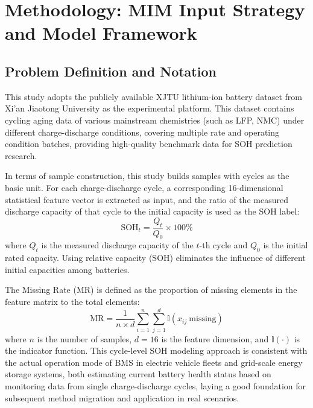 \documentclass[10pt,a4paper]{article}
\begin{document}
\section{Methodology: MIM Input Strategy and Model Framework}\label{sec:method}

\subsection{Problem Definition and Notation}

This study adopts the publicly available XJTU lithium-ion battery dataset from Xi'an Jiaotong University as the experimental platform\cite{wang2024open,duan2025lithium}. This dataset contains cycling aging data of various mainstream chemistries (such as LFP, NMC) under different charge-discharge conditions, covering multiple rate and operating condition batches, providing high-quality benchmark data for SOH prediction research\cite{wang2024open,wang2024pinn}.

In terms of sample construction, this study builds samples with cycles as the basic unit. For each charge-discharge cycle, a corresponding 16-dimensional statistical feature vector is extracted as input, and the ratio of the measured discharge capacity of that cycle to the initial capacity is used as the SOH label:
\begin{equation}
    \text{SOH}_t = \frac{Q_t}{Q_0} \times 100\%
    \label{eq:soh}
\end{equation}
where $Q_t$ is the measured discharge capacity of the $t$-th cycle and $Q_0$ is the initial rated capacity. Using relative capacity (SOH) eliminates the influence of different initial capacities among batteries.

The Missing Rate (MR) is defined as the proportion of missing elements in the feature matrix to the total elements:
\begin{equation}
    \text{MR} = \frac{1}{n \times d} \sum_{i=1}^{n}\sum_{j=1}^{d} \mathbb{I}(x_{ij}\ \text{missing})
    \label{eq:mr}
\end{equation}
where $n$ is the number of samples, $d=16$ is the feature dimension, and $\mathbb{I}(\cdot)$ is the indicator function. This cycle-level SOH modeling approach is consistent with the actual operation mode of BMS in electric vehicle fleets and grid-scale energy storage systems, both estimating current battery health status based on monitoring data from single charge-discharge cycles, laying a good foundation for subsequent method migration and application in real scenarios.
\end{document}

